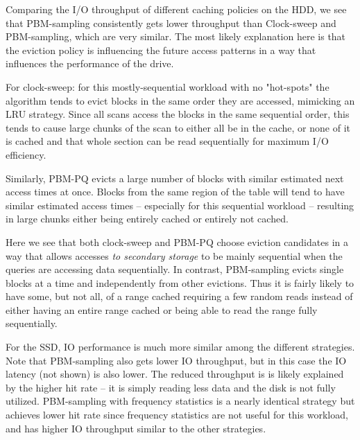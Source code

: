 Comparing the I/O throughput of different caching policies on the HDD, we see that PBM-sampling consistently gets lower throughput than Clock-sweep and PBM-sampling, which are very similar. The most likely explanation here is that the eviction policy is influencing the future access patterns in a way that influences the performance of the drive.

For clock-sweep: for this mostly-sequential workload with no "hot-spots" the algorithm tends to evict blocks in the same order they are accessed, mimicking an LRU strategy. Since all scans access the blocks in the same sequential order, this tends to cause large chunks of the scan to either all be in the cache, or none of it is cached and that whole section can be read sequentially for maximum I/O efficiency. %

Similarly, PBM-PQ evicts a large number of blocks with similar estimated next access times at once. Blocks from the same region of the table will tend to have similar estimated access times -- especially for this sequential workload -- resulting in large chunks either being entirely cached or entirely not cached.

Here we see that both clock-sweep and PBM-PQ choose eviction candidates in a way that allows accesses \textit{to secondary storage} to be mainly sequential when the queries are accessing data sequentially. In contrast, PBM-sampling evicts single blocks at a time and independently from other evictions. Thus it is fairly likely to have some, but not all, of a range cached requiring a few random reads instead of either having an entire range cached or being able to read the range fully sequentially.



For the SSD, IO performance is much more similar among the different strategies. Note that PBM-sampling also gets lower IO throughput, but in this case the IO latency (not shown) is also lower. The reduced throughput is is likely explained by the higher hit rate -- it is simply reading less data and the disk is not fully utilized. PBM-sampling with frequency statistics is a nearly identical strategy but achieves lower hit rate since frequency statistics are not useful for this workload, and has higher IO throughput similar to the other strategies.



